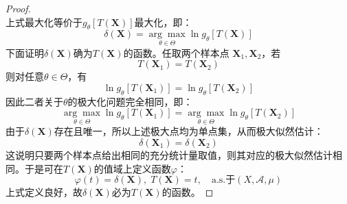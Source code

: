\begin{proof}
\begin{equation*}
	\end{equation*}
	上式最大化等价于$g_{\theta}[T(\mathbf{X})]$最大化，即：
	\begin{equation*}
		\delta(\mathbf{X})=\underset{\theta\in\Theta}{\arg\max}\ln g_{\theta}[T(\mathbf{X})]
	\end{equation*}
	下面证明$\delta(\mathbf{X})$确为$T(\mathbf{X})$的函数。任取两个样本点
	$\mathbf{X}_1,\mathbf{X}_2$，若
	\begin{equation*}
		T(\mathbf{X}_1)=T(\mathbf{X}_2)
	\end{equation*}
	则对任意$\theta\in\Theta$，有
	\begin{equation*}
		\ln g_{\theta}[T(\mathbf{X}_1)]=\ln g_{\theta}[T(\mathbf{X}_2)]
	\end{equation*}
	因此二者关于$\theta$的极大化问题完全相同，即：
	\begin{equation*}
		\underset{\theta\in\Theta}{\arg\max}\ln g_{\theta}[T(\mathbf{X}_1)]=\underset{\theta\in\Theta}{\arg\max}\ln g_{\theta}[T(\mathbf{X}_2)]
	\end{equation*}
	由于$\delta(\mathbf{X})$存在且唯一，所以上述极大点均为单点集，从而极大似然估计：
	\begin{equation*}
		\delta(\mathbf{X}_1)=\delta(\mathbf{X}_2)
	\end{equation*}
	这说明只要两个样本点给出相同的充分统计量取值，则其对应的极大似然估计相同。于是可在$T(\mathbf{X})$的值域上定义函数$\varphi$：
	\begin{equation*}
		\varphi(t)=\delta(\mathbf{X}),\;T(\mathbf{X})=t,\quad\text{a.s.于}(X,\mathscr{A},\mu)
	\end{equation*}
	上式定义良好，故$\delta(\mathbf{X})$必为$T(\mathbf{X})$的函数。
\end{proof}

